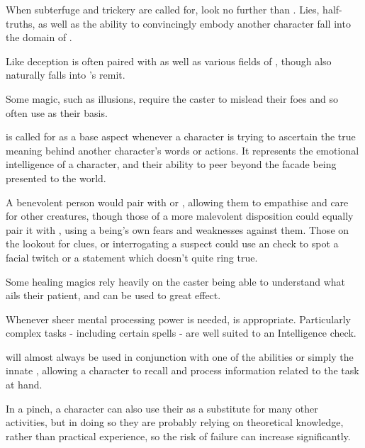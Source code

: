 When subterfuge and trickery are called for, look no further than . Lies, half-truths, as well as the ability to convincingly embody another character fall into the domain of . 

Like  deception is often paired with  as well as various fields of , though  also naturally falls into 's remit. 

Some magic, such as illusions, require the caster to mislead their foes and so often use  as their basis. 



 is called for as a base aspect whenever a character is trying to ascertain the true meaning behind another character's words or actions. It represents the emotional intelligence of a character, and their ability to peer beyond the facade being presented to the world. 

A benevolent person would pair  with  or , allowing them to empathise and care for other creatures, though those of a more malevolent disposition could equally pair it with , using a being's own fears and weaknesses against them. Those on the lookout for clues, or interrogating a suspect could use an  check to spot a facial twitch or a statement which doesn't quite ring true.

Some healing magics rely heavily on the caster being able to understand what ails their patient, and  can be used to great effect.  


Whenever sheer mental processing power is needed,  is appropriate. Particularly complex tasks - including certain spells - are well suited to an Intelligence check.

 will almost always be used in conjunction with one of the  abilities or simply the innate , allowing a character to recall and process information related to the task at hand. 

In a pinch, a character can also use their  as a substitute for many other activities, but in doing so they are probably relying on theoretical knowledge, rather than practical experience, so the risk of failure can increase significantly. 

